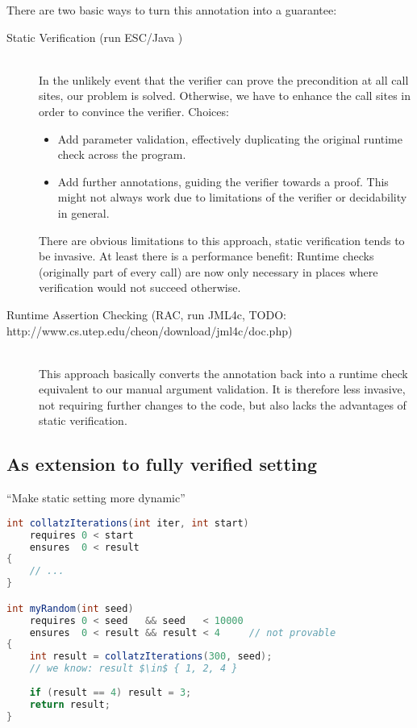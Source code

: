 There are two basic ways to turn this annotation into a guarantee:
\begin{description}
    \item[Static Verification (run ESC/Java \cite{leino2000esc})]~\\
    In the unlikely event that the verifier can prove the precondition at all call sites, our problem is solved.
    Otherwise, we have to enhance the call sites in order to convince the verifier.
    Choices:
    \begin{itemize}
        \item 
        Add parameter validation, effectively duplicating the original runtime check across the program.
        \item
        Add further annotations, guiding the verifier towards a proof.
        This might not always work due to limitations of the verifier or decidability in general.
    \end{itemize}
    There are obvious limitations to this approach, static verification tends to be invasive.
    At least there is a performance benefit: 
    Runtime checks (originally part of every call) are now only necessary in places where verification would not succeed otherwise.
    
    \item[Runtime Assertion Checking (RAC, run JML4c, TODO: http://www.cs.utep.edu/cheon/download/jml4c/doc.php)]~\\
    This approach basically converts the annotation back into a runtime check equivalent to our manual argument validation.
    It is therefore less invasive, not requiring further changes to the code, but also lacks the advantages of static verification.
\end{description}

\subsection{As extension to fully verified setting}
“Make static setting more dynamic”

\begin{lstlisting}[language=Java]
int collatzIterations(int iter, int start)
    requires 0 < start
    ensures  0 < result
{
    // ...
}

int myRandom(int seed)
    requires 0 < seed   && seed   < 10000
    ensures  0 < result && result < 4     // not provable
{
    int result = collatzIterations(300, seed);
    // we know: result $\in$ { 1, 2, 4 }
    
    if (result == 4) result = 3;
    return result;
}
\end{lstlisting}

